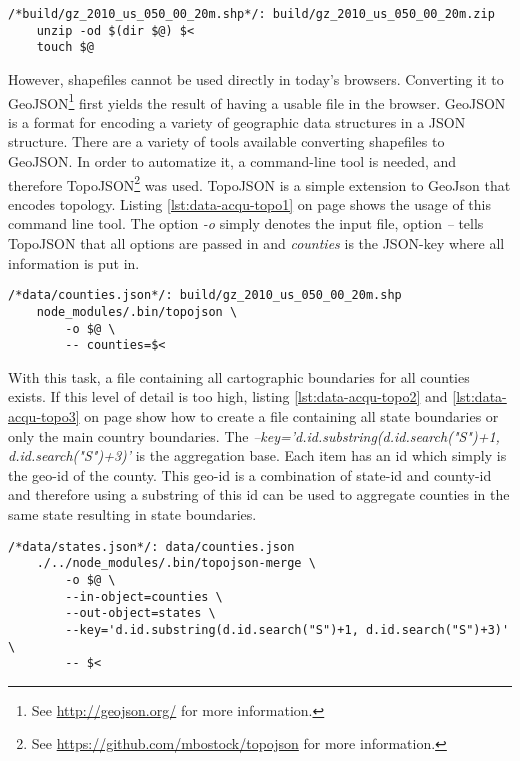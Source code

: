 \begin{lstlisting}[style={makefile}, caption={Make task for unzipping files}, label={lst:data-acqu-unzip}]
/*build/gz_2010_us_050_00_20m.shp*/: build/gz_2010_us_050_00_20m.zip
    unzip -od $(dir $@) $<
    touch $@
\end{lstlisting}

However, shapefiles cannot be used directly in today's browsers. Converting it to GeoJSON\footnote{See \href{http://geojson.org/}{http://geojson.org/} for more information.} first yields the result of having a usable file in the browser. GeoJSON is a format for encoding a variety of geographic data structures in a JSON structure. There are a variety of tools available converting shapefiles to GeoJSON. In order to automatize it, a command-line tool is needed, and therefore TopoJSON\footnote{See \href{https://github.com/mbostock/topojson}{https://github.com/mbostock/topojson} for more information.} was used. TopoJSON is a simple extension to GeoJson that encodes topology. Listing \ref{lst:data-acqu-topo1} on page \pageref{lst:data-acqu-topo1} shows the usage of this command line tool. The option \textit{-o} simply denotes the input file, option \textit{--} tells TopoJSON that all options are passed in and \textit{counties} is the JSON-key where all information is put in.

\begin{lstlisting}[style={makefile}, caption={Make task for converting shapefiles to geojson}, label={lst:data-acqu-topo1}]
/*data/counties.json*/: build/gz_2010_us_050_00_20m.shp
    node_modules/.bin/topojson \
        -o $@ \
        -- counties=$<
\end{lstlisting}

With this task, a file containing all cartographic boundaries for all counties exists. If this level of detail is too high, listing \ref{lst:data-acqu-topo2} and \ref{lst:data-acqu-topo3} on page \pageref{lst:data-acqu-topo2} show how to create a file containing all state boundaries or only the main country boundaries. The \textit{--key='d.id.substring(d.id.search("S")+1, d.id.search("S")+3)'} is the aggregation base. Each item has an id which simply is the geo-id of the county. This geo-id is a combination of state-id and county-id and therefore using a substring of this id can be used to aggregate counties in the same state resulting in state boundaries.

\begin{lstlisting}[style={makefile}, caption={Make task for aggregating counties to states by state-id}, label={lst:data-acqu-topo2}]
/*data/states.json*/: data/counties.json
    ./../node_modules/.bin/topojson-merge \
        -o $@ \
        --in-object=counties \
        --out-object=states \
        --key='d.id.substring(d.id.search("S")+1, d.id.search("S")+3)' \
        -- $<
\end{lstlisting}

